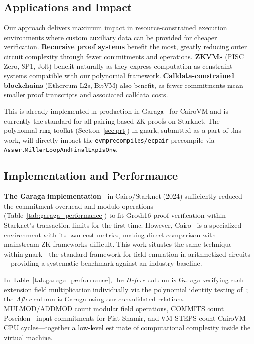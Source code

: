 \subsection{Applications and Impact}

Our approach delivers maximum impact in resource-constrained execution environments where custom auxiliary data can be provided for cheaper verification. \textbf{Recursive proof systems} benefit the most, greatly reducing outer circuit complexity through fewer commitments and operations. \textbf{ZKVMs} (RISC Zero, SP1, Jolt) benefit naturally as they express computation as constraint systems compatible with our polynomial framework. \textbf{Calldata-constrained blockchains} (Ethereum L2s, BitVM) also benefit, as fewer commitments mean smaller proof transcripts and associated calldata costs.

This is already implemented in-production in Garaga~\cite{grg} for CairoVM and is currently the standard for all pairing based ZK proofs on Starknet. The polynomial ring toolkit (Section~\ref{sec:prt}) in gnark, submitted as a part of this work, will directly impact the \texttt{evmprecompiles/ecpair} precompile via \texttt{AssertMillerLoopAndFinalExpIsOne}.

\subsection{Implementation and Performance}

\textbf{The Garaga implementation~\cite{grg}}
in Cairo/Starknet (2024) sufficiently reduced the commitment overhead and modulo operations (Table~\ref{tab:garaga_performance}) to fit Groth16
proof verification within Starknet's transaction limits for the first time.
However, Cairo~\cite{cairo} is a specialized environment with its own cost metrics,
making direct comparison with mainstream ZK frameworks difficult.
This work situates the same technique within gnark---the standard framework for
field emulation in arithmetized circuits---providing a systematic benchmark against
an industry baseline.

In Table~\ref{tab:garaga_performance}, the \emph{Before} column is Garaga verifying each extension field multiplication individually via the polynomial identity testing of~\cite{FXFM23}; the \emph{After} column is Garaga using our consolidated relations. MULMOD/ADDMOD count modular field operations, COMMITS count Poseidon~\cite{USENIX:GKRRS21} input commitments for Fiat-Shamir, and VM STEPS count CairoVM CPU cycles---together a low-level estimate of computational complexity inside the virtual machine.

